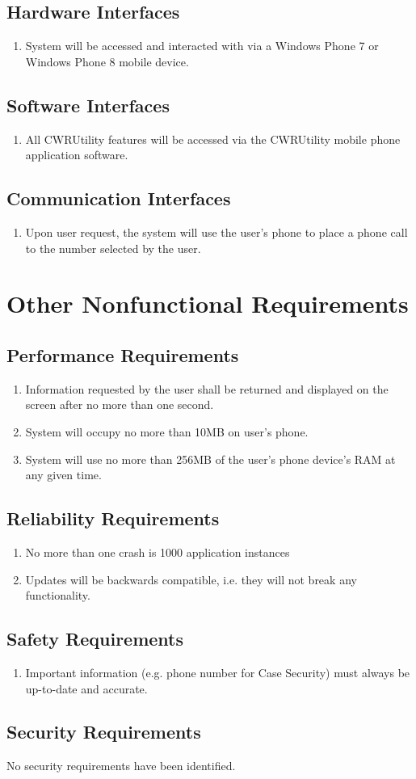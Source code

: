 \documentclass[pdftex,12pt,letter]{article}
\begin{document}
\subsection{Hardware Interfaces}
\begin{enumerate}[HI-1:]
\item System will be accessed and interacted with via a Windows Phone 7 or Windows Phone 8 mobile device.
\end{enumerate}
\subsection{Software Interfaces}
\begin{enumerate}
\item All CWRUtility features will be accessed via the CWRUtility mobile phone application software.
\end{enumerate}
\subsection{Communication Interfaces}
\begin{enumerate}[CI-1]
\item Upon user request, the system will use the user's phone to place a phone call to the number selected by the user.
\end{enumerate}
\section{Other Nonfunctional Requirements}
\subsection{Performance Requirements}
\begin{enumerate}[PR-1:]
\item Information requested by the user shall be returned and displayed on the screen after no more than one second.
\item System will occupy no more than 10MB on user's phone.
\item System will use no more than 256MB of the user's phone device's RAM at any given time.
\end{enumerate}
\subsection{Reliability Requirements}
\begin{enumerate}[RR-1:]
\item No more than one crash is 1000 application instances
\item Updates will be backwards compatible, i.e. they will not break any functionality.
\end{enumerate}
\subsection{Safety Requirements}
\begin{enumerate}[SR-1:]
\item Important information (e.g. phone number for Case Security) must always be up-to-date and accurate.
\end{enumerate}
\subsection{Security Requirements}
No security requirements have been identified.
\end{document}
